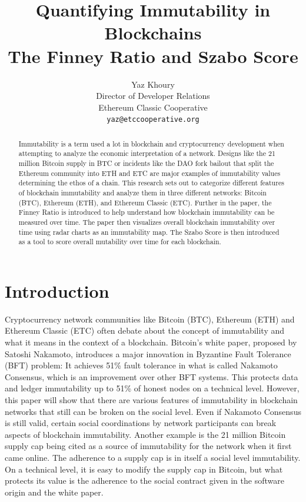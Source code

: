 \documentclass{article}
\title{
        Quantifying Immutability in Blockchains\\
        \large The Finney Ratio and Szabo Score
}
\subtitle{}
\author{
        Yaz Khoury \\
        Director of Developer Relations\\
        Ethereum Classic Cooperative\\
        \texttt{yaz@etccooperative.org} \\
}
\begin{document}
\maketitle

\begin{abstract}
Immutability is a term used a lot in blockchain and cryptocurrency development when attempting to analyze the economic interpretation of a network. Designs like the 21 million Bitcoin supply in BTC or incidents like the DAO fork bailout that split the Ethereum community into ETH and ETC are major examples of immutability values determining the ethos of a chain. This research sets out to categorize different features of blockchain immutability and analyze them in three different networks: Bitcoin (BTC), Ethereum (ETH), and Ethereum Classic (ETC). Further in the paper, the Finney Ratio is introduced to help understand how blockchain immutability can be measured over time. The paper then visualizes overall blockchain immutability over time using radar charts as an immutability map. The Szabo Score is then introduced as a tool to score overall mutability over time for each blockchain.

\end{abstract}



\section{Introduction}
Cryptocurrency network communities like Bitcoin (BTC), Ethereum (ETH) and Ethereum Classic (ETC) often debate about the concept of immutability and what it means in the context of a blockchain. Bitcoin's white paper\cite{bitcoinpaper}, proposed by Satoshi Nakamoto, introduces a major innovation in Byzantine Fault Tolerance (BFT) problem: It achieves 51\% fault tolerance in what is called Nakamoto Consensus, which is an improvement over other BFT systems. This protects data and ledger immutability up to 51\% of honest nodes on a technical level. However, this paper will show that there are various features of immutability in blockchain networks that still can be broken on the social level. Even if Nakamoto Consensus is still valid, certain social coordinations by network participants can break aspects of blockchain immutability. Another example is the 21 million\cite{bitcoinmailing} Bitcoin supply cap being cited as a source of immutability for the network when it first came online. The adherence to a supply cap is in itself a social level immutability. On a technical level, it is easy to modify the supply cap in Bitcoin, but what protects its value is the adherence to the social contract given in the software origin and the white paper. 
\end{document}
